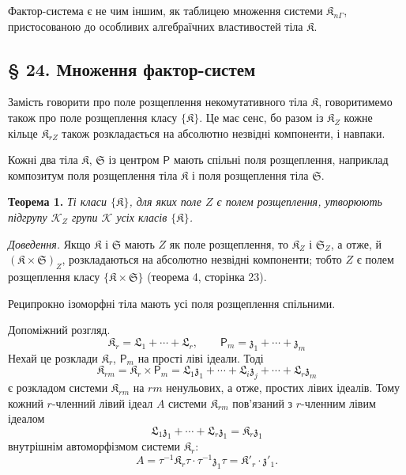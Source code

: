 \documentclass[11pt]{article}
\begin{document}
Фактор-система є не чим іншим, як таблицею множення системи \(\mathfrak K_{n\Gamma}\), пристосованою до особливих алгебраїчних властивостей тіла \(\mathfrak K\).

\subsection*{§ 24. Множення фактор-систем}\label{multiplikation-von-faktorensystemen}

Замість говорити про поле розщеплення некомутативного тіла \(\mathfrak K\), говоритимемо також про поле розщеплення класу \(\{\mathfrak K\}\). Це має сенс, бо разом із \(\mathfrak K_Z\) кожне кільце \(\mathfrak K_{rZ}\) також розкладається на абсолютно незвідні компоненти, і навпаки.

Кожні два тіла \(\mathfrak K\), \(\mathfrak S\) із центром \(\mathsf P\) мають спільні поля розщеплення, наприклад композитум поля розщеплення тіла \(\mathfrak K\) і поля розщеплення тіла \(\mathfrak S\).

\textbf{Теорема 1.} \emph{Ті класи \(\{\mathfrak K\}\), для яких поле \(Z\) є полем розщеплення, утворюють підгрупу \(\mathscr K_Z\) групи \(\mathscr K\) усіх класів \(\{\mathfrak K\}\).}

\emph{Доведення.} Якщо \(\mathfrak K\) і \(\mathfrak S\) мають \(Z\) як поле розщеплення, то \(\mathfrak K_Z\) і \(\mathfrak S_Z\), а отже, й \((\mathfrak K\times\mathfrak S)_Z\), розкладаються на абсолютно незвідні компоненти; тобто \(Z\) є полем розщеплення класу \(\{\mathfrak K\times\mathfrak S\}\) (теорема 4, сторінка 23).

Реципрокно ізоморфні тіла мають усі поля розщеплення спільними.

Допоміжний розгляд.
\[
\mathfrak K_r=\mathfrak L_1+\cdots+\mathfrak L_r,\qquad
\mathsf P_m=\mathfrak z_1+\cdots+\mathfrak z_m
\]
Нехай це розклади \(\mathfrak K_r\), \(\mathsf P_m\) на прості ліві ідеали. Тоді
\[
\mathfrak K_{rm}=\mathfrak K_r\times\mathsf P_m
=\mathfrak L_1\mathfrak z_1+\cdots+\mathfrak L_i\mathfrak z_j+\cdots+\mathfrak L_r\mathfrak z_m
\]
є розкладом системи \(\mathfrak K_{rm}\) на \(rm\) ненульових, а отже, простих лівих ідеалів. Тому кожний \(r\)-членний лівий ідеал \(A\) системи \(\mathfrak K_{rm}\) пов'язаний з \(r\)-членним лівим ідеалом
\[
\mathfrak L_1\mathfrak z_1+\cdots+\mathfrak L_r\mathfrak z_1=\mathfrak K_r\mathfrak z_1
\]
внутрішнім автоморфізмом системи \(\mathfrak K_r\):
\[
A=\tau^{-1}\mathfrak K_r\tau\cdot\tau^{-1}\mathfrak z_1\tau
=\mathfrak K'_r\cdot\mathfrak z'_1.
\]
\end{document}
